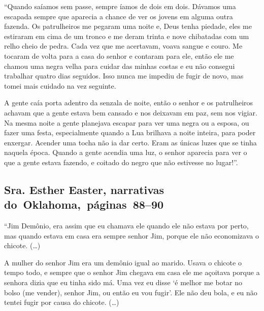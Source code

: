 ``Quando saíamos sem passe, sempre íamos de dois em dois. Dávamos uma
escapada sempre que aparecia a chance de ver os jovens em alguma outra
fazenda. Os patrulheiros me pegaram uma noite e, Deus tenha piedade,
eles me estiraram em cima de um tronco e me deram trinta e nove
chibatadas com um relho cheio de pedra. Cada vez que me acertavam, voava
sangue e couro. Me tocaram de volta para a casa do senhor e contaram
para ele, então ele me chamou uma negra velha para cuidar das minhas
costas e eu não consegui trabalhar quatro dias seguidos. Isso nunca me
impediu de fugir de novo, mas tomei mais cuidado na vez seguinte.

A gente caía porta adentro da senzala de noite, então o senhor e os
patrulheiros achavam que a gente estava bem cansado e nos deixavam em
paz, sem nos vigiar. Na mesma noite a gente planejava escapar para ver
uma negra ou a esposa, ou fazer uma festa, especialmente quando a Lua
brilhava a noite inteira, para poder enxergar. Acender uma tocha não ia
dar certo. Eram as únicas luzes que se tinha naquela época. Quando a
gente acendia uma luz, o senhor aparecia para ver o que a gente estava
fazendo, e coitado do negro que não estivesse no lugar!''.

\subsection{Sra. Esther Easter, narrativas do~Oklahoma,~páginas~88--90} \label{ref78}

``Jim Demônio, era assim que eu chamava ele quando ele não estava por
perto, mas quando estava em casa era sempre senhor Jim, porque ele não
economizava o chicote. (\ldots{})

A mulher do senhor Jim era um demônio igual ao marido. Usava o chicote o
tempo todo, e sempre que o senhor Jim chegava em casa ele me açoitava
porque a senhora dizia que eu tinha sido má. Uma vez eu disse `é melhor
me botar no bolso (me vender), senhor Jim, ou então eu vou fugir'. Ele
não deu bola, e eu não tentei fugir por causa do chicote. (\ldots{})

